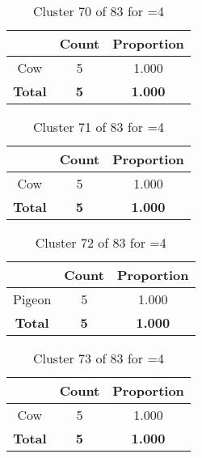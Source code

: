 \clearpage
\begin{table}[ht!]
\centering
\begin{tabular}{|c|c|c|}
\hline
\bf \Spec{} &\bf Count &\bf Proportion\\ \hline \hline
Cow & 5 & 1.000\\ \hline
\hline
\bf Total & \bf 5 & \bf 1.000\\ \hline
\end{tabular}
\label{tab:cluster:70:4}
\caption{Cluster 70 of 83 for \minneigh{}=4}
\end{table}

\begin{table}[ht!]
\centering
\begin{tabular}{|c|c|c|}
\hline
\bf \Spec{} &\bf Count &\bf Proportion\\ \hline \hline
Cow & 5 & 1.000\\ \hline
\hline
\bf Total & \bf 5 & \bf 1.000\\ \hline
\end{tabular}
\label{tab:cluster:71:4}
\caption{Cluster 71 of 83 for \minneigh{}=4}
\end{table}

\begin{table}[ht!]
\centering
\begin{tabular}{|c|c|c|}
\hline
\bf \Spec{} &\bf Count &\bf Proportion\\ \hline \hline
Pigeon & 5 & 1.000\\ \hline
\hline
\bf Total & \bf 5 & \bf 1.000\\ \hline
\end{tabular}
\label{tab:cluster:72:4}
\caption{Cluster 72 of 83 for \minneigh{}=4}
\end{table}

\begin{table}[ht!]
\centering
\begin{tabular}{|c|c|c|}
\hline
\bf \Spec{} &\bf Count &\bf Proportion\\ \hline \hline
Cow & 5 & 1.000\\ \hline
\hline
\bf Total & \bf 5 & \bf 1.000\\ \hline
\end{tabular}
\label{tab:cluster:73:4}
\caption{Cluster 73 of 83 for \minneigh{}=4}
\end{table}


